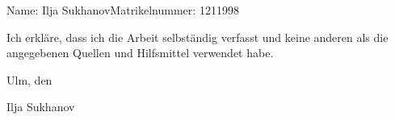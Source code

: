\documentclass[a4paper,12pt,
headsepline,           %
oneside,               %
pointlessnumbers,      %
bibtotoc,              %
BCOR15mm               %
]{scrbook}
\newcommand{\fullname}{Ilja Sukhanov}
\newcommand{\matnr}{1211998}
\begin{document}

\tableofcontents

\mainmatter








\appendix

\backmatter

\printbibliography

\clearpage
\thispagestyle{empty}

Name: \fullname \hfill Matrikelnummer: \matnr \vspace{2cm}


Ich erkläre, dass ich die Arbeit selbständig verfasst und keine anderen als die angegebenen Quellen und Hilfsmittel verwendet habe.\vspace{2cm}


Ulm, den \dotfill

\hspace{10cm} {\footnotesize \fullname}
\end{document}
